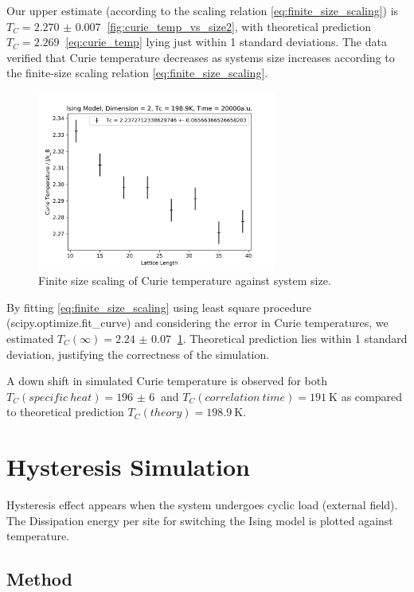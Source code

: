 \documentclass[%
showkeys,
bibnotes,
amsmath,amssymb,
floatfix,
]{revtex4-1}
\begin{document}
Our upper estimate (according to the scaling relation \ref{eq:finite_size_scaling}) is $T_C = \SI{2.270(7)}{}$ \ref{fig:curie_temp_vs_size2}, with theoretical prediction $T_C = \SI{2.269}{}$ \ref{eq:curie_temp} lying just within 1 standard deviations. The data verified that Curie temperature decreases as systems size increases according to the finite-size scaling relation \ref{eq:finite_size_scaling}.

\begin{figure}[H] \centering
	\includegraphics[width=0.7\textwidth]{../figures/finite_size}
	\caption{\label{fig:finite_size} Finite size scaling of Curie temperature against system size.}
\end{figure}
By fitting \ref{eq:finite_size_scaling} using least square procedure (scipy.optimize.fit\_curve) and considering the error in Curie temperatures, we estimated $T_C(\infty) = \SI{2.24(7)}{}$ \ref{fig:finite_size}. Theoretical prediction lies within 1 standard deviation, justifying the correctness of the simulation.

A down shift in simulated Curie temperature is observed for both $T_C(specific\ heat) = \SI{196(6)}{}$ and $T_C(correlation\ time) = \SI{191}{\kelvin}$ as compared to theoretical prediction $T_C(theory) = \SI{198.9}{\kelvin}$. 

\section{\label{sec:hysteresis}Hysteresis Simulation}
Hysteresis effect appears when the system undergoes cyclic load (external field). The Dissipation energy per site for switching the Ising model is plotted against temperature.

\subsection{\label{sec:level2}Method}
\end{document}
